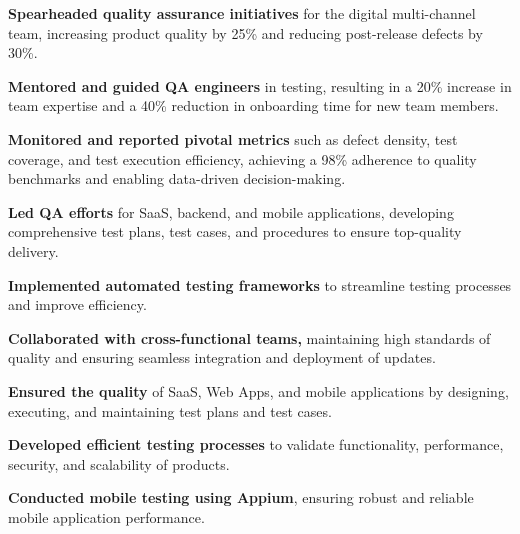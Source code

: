 \documentclass[hmargin=1.25cm,vmargin=0.75cm,scale=0.9]{deedy-resume-openfont}
\begin{document}
\begin{minipage}[t]{0.66\textwidth}
\begin{tightemize}
\item \textbf{Spearheaded quality assurance initiatives} for the digital multi-channel team, increasing product quality by 25\% and reducing post-release defects by 30\%.
\item \textbf{Mentored and guided QA engineers} in testing, resulting in a 20\% increase in team expertise and a 40\% reduction in onboarding time for new team members.
\item \textbf{Monitored and reported pivotal metrics} such as defect density, test coverage, and test execution efficiency, achieving a 98\% adherence to quality benchmarks and enabling data-driven decision-making.
\end{tightemize}

\begin{tightemize}
\item \textbf{Led QA efforts} for SaaS, backend, and mobile applications, developing comprehensive test plans, test cases, and procedures to ensure top-quality delivery.
\item \textbf{Implemented automated testing frameworks} to streamline testing processes and improve efficiency.
\item \textbf{Collaborated with cross-functional teams,} maintaining high standards of quality and ensuring seamless integration and deployment of updates.
\end{tightemize}

\begin{tightemize}
\item \textbf{Ensured the quality} of SaaS, Web Apps, and mobile applications by designing, executing, and maintaining test plans and test cases.
\item \textbf{Developed efficient testing processes} to validate functionality, performance, security, and scalability of products.
\item \textbf{Conducted mobile testing using Appium}, ensuring robust and reliable mobile application performance.
\end{tightemize}

\end{minipage}
\end{document}
